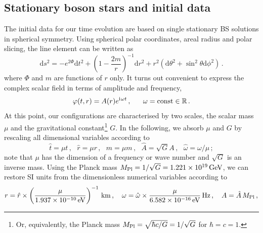 \documentclass[]{iopart}
\newcommand{\iu}{\mathrm{i}\mkern1mu}
\newcommand{\du}{\mathrm{d}}
\begin{document}
\subsection{Stationary boson stars and initial data}
%
The initial data for our time evolution are based on single stationary
BS solutions in spherical symmetry.
Using spherical polar coordinates,
areal radius and polar slicing, the
line element can be written as
%
\begin{equation}
  \du s^2 =
  -e^{2\Phi} \du t^2
  + \left(1-\frac{2m}{r}\right)^{-1} \du r^2
  + r^2
  (
  \du \theta^2
  + \sin^2\theta \du \phi^2
  )\,.
  \label{eq:ds2sym}
\end{equation}
%
where $\Phi$ and $m$ are functions of $r$ only.
It turns out convenient to express the complex
scalar field in terms of amplitude and frequency,
%
\begin{equation}
  \varphi(t,r) =
  A(r)
  e^{\iu \omega t}\,,~~~~~\omega = \mathrm{const}\in \mathbb{R}\,.
\end{equation}
%
At this point, our configurations are characterised by two
scales, the scalar mass $\mu$ and the gravitational
constant\footnote{Or, equivalently, the Planck mass
$M_{\rm Pl}=\sqrt{\hbar c/G}=1/\sqrt{G}$ for $\hbar=c=1$.} $G$.
In the following, we absorb $\mu$ and $G$ by rescaling all
dimensional variables according to
%
\begin{equation}
  \hat{t}=\mu t\,,~~~
  \hat{r}=\mu r\,,~~~
  \hat{m}=\mu m\,,~~~
  \hat{A}=\sqrt{G} A\,,~~~
  \hat{\omega}=\omega/\mu\,;
  \label{eq:rescaling}
\end{equation}
%
note that $\mu$ has the dimension of a frequency or wave number
and $\sqrt{G}$ is an inverse mass. Using the Planck mass
$M_{\rm Pl}=1/\sqrt{G}=1.221\times10^{19}\,{\rm GeV}$, we
can restore SI units from the dimensionless numerical variables
according to
%
\begin{equation}
  r = \hat{r} \times
  \left(
  \frac{\mu}{1.937\times 10^{-10}\,{\rm eV}}
  \right)^{-1}\,{\rm km}\,,~~~
  \omega = \hat{\omega}\times
  \frac{\mu}{6.582\times 10^{-16}\,{\rm eV}}\,{\rm Hz}
  \,,~~~
  A=\hat{A}\,M_{\rm Pl}\,,
  \nonumber
\end{equation}
\end{document}
